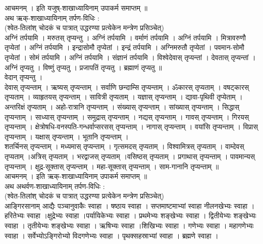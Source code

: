 \documentclass[12pt]{article}
\begin{document}
{{{आचमनम् । इति यजुष्-शाखाध्यायिनाम् उपाकर्म समाप्तम् ॥\\

अथ ऋक्-शाखाध्यायिनाम् तर्पण-विधिः :\\
(श्वेत-तिलांश् चोदकं च पात्रात् उद्धरण्या प्रत्येकेन मन्त्रेण प्रसिञ्चेत्)\\

अग्निं तर्पयामि । मरुतस् तृप्यन्तु । अग्निं तर्पयामि । वर्माणं तर्पयामि । अग्निं तर्पयामि । मित्रावरुणौ तृप्येतां । अग्निं तर्पयामि । इन्द्रासोमौ तृप्येतां । इन्द्रं तर्पयामि । अग्निमरुतौ तृप्येतां । पवमान-सोमौ तृप्येतां । सोमं तर्पयामि । अग्निं तर्पयामि । संज्ञानं तर्पयामि । विश्वेदेवास् तृप्यन्तां । देवतास् तृप्यन्तां ।\\

अग्निं तृप्यतु । विष्णुं तृप्यतु । प्रजापतिं तृप्यतु । ब्रह्माणं तृप्यतु ॥\\

वेदान् तृप्यन्तु ।\\

देवास् तृप्यन्ताम् । ऋष्यस् तृप्यन्ताम् । सर्वाणि छन्दाम्सि तृप्यन्ताम् । ॐकारस् तृप्यताम् । वषट्कारस् तृप्यताम् । व्याहृतयस् तृप्यन्ताम् । सावित्री तृप्यताम् । यज्ञास् तृप्यन्ताम् । द्यावा-पृथिवी तृप्येताम् । अन्तरिक्षं तृप्यताम् । अहो-रात्रानि तृप्यन्ताम् । संख्यास् तृप्यन्ताम् । सांख्यास् तृप्यन्ताम् । सिद्धास् तृप्यन्ताम् । साध्यास् तृप्यन्ताम् । समुद्रास् तृप्यन्ताम् । नद्यस् तृप्यन्ताम् । गावस् तृप्यन्ताम् । गिरयस् तृप्यन्ताम् । क्षेत्रोषधि-वनस्पति-गन्धर्वाप्सरसस् तृप्यन्ताम् । नागास् तृप्यन्ताम् । वयांसि तृप्यन्ताम् । विप्रास् तृप्यन्ताम् । यक्षास् तृप्यन्ताम् । भूतानि तृप्यन्ताम् ।\\

शतर्चिनस् तृप्यन्ताम् । मध्यमास् तृप्यन्ताम् । गृत्समदस् तृप्यताम् । विश्वामित्रस् तृप्यताम् । वाम्देवस् तृप्यताम् ।अत्रिस् तृप्यताम् । भरद्वाजस् तृप्यताम् ।वसिष्ठस् तृप्यताम् । प्रगाथास् तृप्यन्ताम् । पावमान्यस् तृप्यन्ताम् । क्षुद्र-सूक्तास् तृप्यन्ताम् । महा-सूक्तास् तृप्यन्ताम् । साम-गानानि तृप्यन्ताम् ॥\\

आचमनम् । इति ऋक्-शाखाध्यायिनाम् उपाकर्म समाप्तम् ॥\\

अथ अथर्वण-शाखाध्यायिनाम् तर्पण-विधिः :\\
(श्वेत-तिलांश् चोदकं च पात्रात् उद्धरण्या प्रत्येकेन मन्त्रेण प्रसिञ्चेत्)\\

आङ्गिरसानाम् आद्यैः पञ्चानुवाकैः स्वाहा । षष्ठाय स्वाहा । सप्तमाष्टमाभ्यां स्वाहा नीलनखेभ्यः स्वाहा । हरितेभ्यः स्वाहा ।क्षुद्रेभ्यः स्वाहा ।पर्यायिकेभ्यः स्वाहा । प्रथमेभ्यः शङ्खेभ्यः स्वाहा । द्वितीयेभ्यः शङ्खेभ्यः स्वाहा । तृतीयेभ्यः शङ्खेभ्यः स्वाहा । ऋषिभ्यः स्वाहा ।शिखिभ्यः स्वाहा । गणेभ्यः स्वाहा । महागणेभ्यः स्वाहा । सर्वेभ्योऽङ्गिरोभ्यो विदगणेभ्यः स्वाहा । पृथक्सहस्राभ्यां स्वाहा । ब्रह्मणे स्वाहा । \\

}}}
\end{document}
